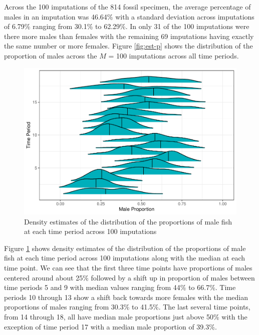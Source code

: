 \documentclass[
  12pt,
]{article}
\begin{document}
Across the 100 imputations of the 814 fossil specimen, the average
percentage of males in an imputation was 46.64\% with a standard
deviation across imputations of 6.79\% ranging from 30.1\% to 62.29\%.
In only 31 of the 100 imputations were there more males than females
with the remaining 69 imputations having exactly the same number or more
females. Figure \ref{fig:est-p} shows the distribution of the proportion
of males across the \(M\) = 100 imputations across all time periods.

\begin{figure}

{\centering \includegraphics{paper_files/figure-latex/male-prop-1} 

}

\caption{Density estimates of the distribution of the proportions of male fish at each time period across 100 imputations}\label{fig:male-prop}
\end{figure}

Figure \ref{fig:male-prop} shows density estimates of the distribution
of the proportions of male fish at each time period across 100
imputations along with the median at each time point. We can see that
the first three time points have proportions of males centered around
about 25\% followed by a shift up in proportion of males between time
periods 5 and 9 with median values ranging from 44\% to 66.7\%. Time
periods 10 through 13 show a shift back towards more females with the
median proportions of males ranging from 30.3\% to 41.5\%. The last
several time points, from 14 through 18, all have median male
proportions just above 50\% with the exception of time period 17 with a
median male proportion of 39.3\%.
\end{document}

